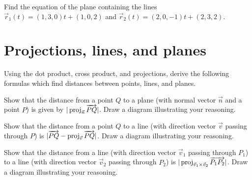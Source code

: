 \begin{problem}
  Find the equation of the plane containing the lines $\vec r_1(t)=(1,3,0)t+(1,0,2)$ and $\vec r_2(t)=(2,0,-1)t+(2,3,2)$.
\end{problem}

\section{Projections, lines, and planes}

Using the dot product, cross product, and projections, derive the
following formulas which find distances between points, lines, and
planes. 

\begin{problem}
  Show that the distance from a point $Q$ to a plane (with normal vector {$\vec n$} and a point $P$) is given by $|\operatorname{proj}_{\vec n}\overrightarrow {PQ}|$. Draw a diagram illustrating your reasoning.
\end{problem}


\begin{problem}
  Show that the distance from a point $Q$ to a line (with direction vector $\vec v$ passing through $P$) is $|\overrightarrow{PQ}-\operatorname{proj}_{\vec v}\overrightarrow {PQ}|$. Draw a diagram illustrating your reasoning.
\end{problem}

\begin{problem}
  Show that the distance from a line (with direction vector $\vec v_1$ passing through $P_1$) to a line (with direction vector $\vec v_2$ passing through $P_2$) is $|\operatorname{proj}_{\vec v_1\times\vec v_2}\overrightarrow {P_1P_2}|$. Draw a diagram illustrating your reasoning.
\end{problem}

